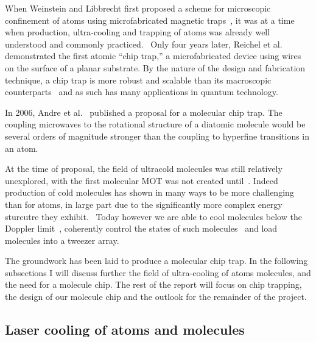 
When Weinstein and Libbrecht first proposed a scheme for microscopic confinement
of atoms using microfabricated magnetic traps~\cite{PhysRevA.52.4004}, it was at
a time when production, ultra-cooling and trapping of atoms was already well
understood and commonly practiced.~ Only four
years later, Reichel et al.~\cite{Reichel1999} demonstrated the first atomic
``chip trap,'' a microfabricated device using wires on the surface of a planar
substrate. By the nature of the design and fabrication technique, a chip trap is
more robust and scalable than its macroscopic counterparts~ and
as such has many applications in quantum technology.


In 2006, Andre et al.~\cite{Andre2006} published a proposal for a molecular chip
trap. The coupling microwaves to the rotational structure of a diatomic molecule
would be several orders of magnitude stronger than the coupling to hyperfine
transitions in an atom. 

At the time of proposal, the field of ultracold molecules was still relatively
unexplored, with the first molecular MOT was not created until~. Indeed production of cold molecules has shown in many ways to be more
challenging than for atoms, in large part due to the significantly more complex
energy sturcutre they exhibit.~ Today however we are able to cool
molecules below the Doppler limit~\cite{Truppe2017}, coherently control the
states of such molecules~\cite{PhysRevLett.120.163201} and load molecules into a
tweezer array.~\cite{Anderegg2019}

The groundwork has been laid to produce a molecular chip trap. In the following
subsections I will discuss further the field of ultra-cooling of atoms
molecules, and the need for a molecule chip. The rest of the report will focus
on chip trapping, the design of our molecule chip and the outlook for the
remainder of the project.

\subsection{Laser cooling of atoms and molecules}
\label{intro:lasercool}

